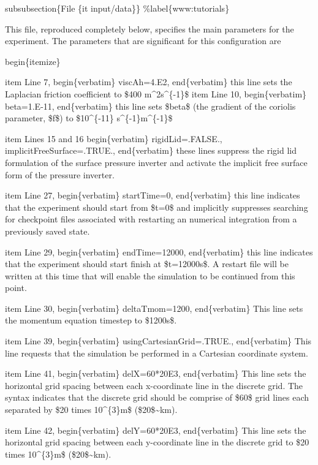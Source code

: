 \documentclass[letterpaper,10pt,english]{sphinxmanual}
\begin{document}
subsubsection\{File \{it input/data\}\}
\%label\{www:tutorials\}

This file, reproduced completely below, specifies the main parameters
for the experiment. The parameters that are significant for this configuration
are

begin\{itemize\}

item Line 7, begin\{verbatim\} viscAh=4.E2, end\{verbatim\} this line sets
the Laplacian friction coefficient to \$400 m\textasciicircum{}2s\textasciicircum{}\{-1\}\$
item Line 10, begin\{verbatim\} beta=1.E-11, end\{verbatim\} this line sets
\$beta\$ (the gradient of the coriolis parameter, \$f\$) to \$10\textasciicircum{}\{-11\} s\textasciicircum{}\{-1\}m\textasciicircum{}\{-1\}\$

item Lines 15 and 16
begin\{verbatim\}
rigidLid=.FALSE.,
implicitFreeSurface=.TRUE.,
end\{verbatim\}
these lines suppress the rigid lid formulation of the surface
pressure inverter and activate the implicit free surface form
of the pressure inverter.

item Line 27,
begin\{verbatim\}
startTime=0,
end\{verbatim\}
this line indicates that the experiment should start from \$t=0\$
and implicitly suppresses searching for checkpoint files associated
with restarting an numerical integration from a previously saved state.

item Line 29,
begin\{verbatim\}
endTime=12000,
end\{verbatim\}
this line indicates that the experiment should start finish at \$t=12000s\$.
A restart file will be written at this time that will enable the
simulation to be continued from this point.

item Line 30,
begin\{verbatim\}
deltaTmom=1200,
end\{verbatim\}
This line sets the momentum equation timestep to \$1200s\$.

item Line 39,
begin\{verbatim\}
usingCartesianGrid=.TRUE.,
end\{verbatim\}
This line requests that the simulation be performed in a
Cartesian coordinate system.

item Line 41,
begin\{verbatim\}
delX=60*20E3,
end\{verbatim\}
This line sets the horizontal grid spacing between each x-coordinate line
in the discrete grid. The syntax indicates that the discrete grid
should be comprise of \$60\$ grid lines each separated by \$20 times 10\textasciicircum{}\{3\}m\$
(\$20\$\textasciitilde{}km).

item Line 42,
begin\{verbatim\}
delY=60*20E3,
end\{verbatim\}
This line sets the horizontal grid spacing between each y-coordinate line
in the discrete grid to \$20 times 10\textasciicircum{}\{3\}m\$ (\$20\$\textasciitilde{}km).
\end{document}
